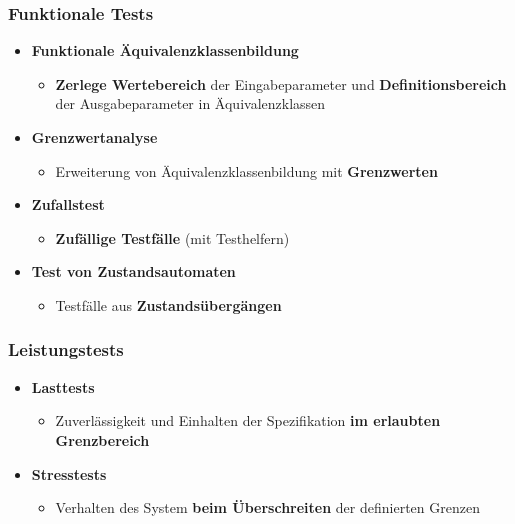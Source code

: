 		\subsubsection{Funktionale Tests}
			
			\begin{itemize}
				\item \textbf{Funktionale Äquivalenzklassenbildung}
				\begin{itemize}
					\item \textbf{Zerlege Wertebereich} der Eingabeparameter und \textbf{Definitionsbereich} der Ausgabeparameter in Äquivalenzklassen
				\end{itemize}
				\item \textbf{Grenzwertanalyse}
				\begin{itemize}
					\item Erweiterung von Äquivalenzklassenbildung mit \textbf{Grenzwerten}
				\end{itemize}
				\item \textbf{Zufallstest}
				\begin{itemize}
					\item \textbf{Zufällige Testfälle} (mit Testhelfern)
				\end{itemize}
				\item \textbf{Test von Zustandsautomaten}
				\begin{itemize}
					\item Testfälle aus \textbf{Zustandsübergängen}
				\end{itemize}
			\end{itemize}
		
		\subsubsection{Leistungstests}
				
			\begin{itemize}
				\item \textbf{Lasttests}
				\begin{itemize}
					\item Zuverlässigkeit und Einhalten der Spezifikation \textbf{im erlaubten Grenzbereich}
				\end{itemize}
				\item \textbf{Stresstests}
				\begin{itemize}
					\item Verhalten des System \textbf{beim Überschreiten} der definierten Grenzen
				\end{itemize}
			\end{itemize}
		
